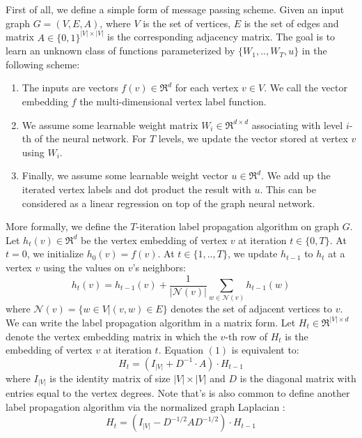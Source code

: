 \documentclass[a4paper]{article}
\begin{document}
First of all, we define a simple form of message passing scheme. Given an input graph $G = (V, E, A)$, where $V$ is the set of vertices, $E$ is the set of edges and matrix $A \in \{0, 1\}^{|V| \times |V|}$ is the corresponding adjacency matrix. The goal is to learn an unknown class of functions parameterized by $\{W_1, .., W_T, u\}$ in the following scheme:
\begin{enumerate}
    \item The inputs are vectors $f(v) \in \Re^d$ for each vertex $v \in V$. We call the vector embedding $f$ the multi-dimensional vertex label function.
    \item We assume some learnable weight matrix $W_i \in \Re^{d \times d}$ associating with level $i$-th of the neural network. For $T$ levels, we update the vector stored at vertex $v$ using $W_i$.
    \item Finally, we assume some learnable weight vector $u \in \Re^d$. We add up the iterated vertex labels and dot product the result with $u$. This can be considered as a linear regression on top of the graph neural network.
\end{enumerate}
More formally, we define the $T$-iteration label propagation algorithm on graph $G$. Let $h_t(v) \in \Re^d$ be the vertex embedding of vertex $v$ at iteration $t \in \{0, T\}$. At $t = 0$, we initialize $h_0(v) = f(v)$. At $t \in \{1, .., T\}$, we update $h_{t-1}$ to $h_t$ at a vertex $v$ using the values on $v$'s neighbors:
\begin{equation}
h_t(v) = h_{t - 1}(v) + \frac{1}{|\mathcal{N}(v)|}\sum\limits_{w \in \mathcal{N}(v)} h_{t - 1}(w)
\end{equation}
where $\mathcal{N}(v) = \{w \in V | (v, w) \in E\}$ denotes the set of adjacent vertices to $v$. We can write the label propagation algorithm in a matrix form. Let $H_t \in \Re^{|V| \times d}$ denote the vertex embedding matrix in which the $v$-th row of $H_t$ is the embedding of vertex $v$ at iteration $t$. Equation $(1)$ is equivalent to:
\begin{equation}
H_t = (I_{|V|} + D^{-1} \cdot A) \cdot H_{t - 1}
\end{equation}
where $I_{|V|}$ is the identity matrix of size $|V| \times |V|$ and $D$ is the diagonal matrix with entries equal to the vertex degrees. Note that's is also common to define another label propagation algorithm via the normalized graph Laplacian \cite{Thomas}:
\begin{equation}
H_t = (I_{|V|} - D^{-1/2}AD^{-1/2}) \cdot H_{t - 1}
\end{equation}
\end{document}

